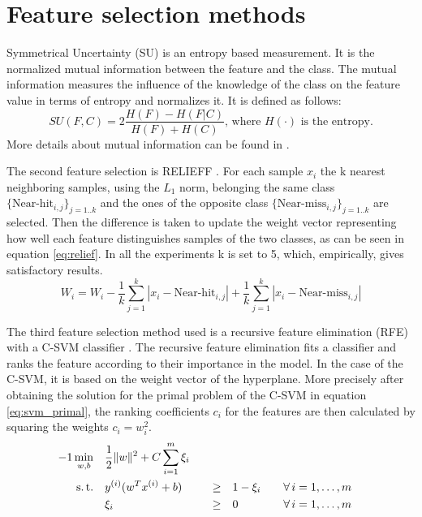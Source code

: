 \documentclass[twoside,11pt]{article}
\begin{document}
\section{Feature selection methods}

Symmetrical Uncertainty (SU) \citep{press1996numerical} is an entropy based measurement. It is the normalized mutual information between the feature and the class. The mutual information measures the influence of the knowledge of the class on the feature value in terms of entropy and normalizes it. It is defined as follows:
\begin{equation}
  \label{eq:su}
  SU(F,C) = 2 \frac{H(F) - H(F|C)}{H(F) + H(C)} \textrm{, where } H(\cdot) \textrm{ is the entropy.}
\end{equation}
More details about mutual information can be found in \cite{paninski2003estimation}. 

The second feature selection is RELIEFF \citep{kononenko1997overcoming}. For each sample $x_i$ the k nearest neighboring samples, using the $L_1$ norm, belonging the same class $\{\textrm{Near-hit}_{i, j}\}_{j=1..k}$ and the ones of the opposite class $\{\textrm{Near-miss}_{i, j}\}_{j=1..k}$ are selected. Then the difference is taken to update the weight vector representing how well each feature distinguishes samples of the two classes, as can be seen in equation \ref{eq:relief}. In all the experiments k is set to 5, which, empirically, gives satisfactory results.
\begin{equation}
  \label{eq:relief}
  W_i = W_i - \frac{1}{k}\sum_{j=1}^{k}|x_i - \textrm{Near-hit}_{i,j}| + \frac{1}{k}\sum_{j=1}^{k} |x_i - \textrm{Near-miss}_{i,j}|
\end{equation}

The third feature selection method used is a recursive feature elimination (RFE) with a C-SVM classifier \citep{guyon2002gene}. 
The recursive feature elimination fits a classifier and ranks the feature according to their importance in the model. In the case of the C-SVM, it is based on the weight vector of the hyperplane. More precisely after obtaining the solution for the primal problem of the C-SVM in equation \ref{eq:svm_primal}, the ranking coefficients $c_i$ for the features are then calculated by squaring the weights $c_i = w_i^2$.
\begin{alignat}{-1}
     \min_{w,b}  & \quad \frac12\|w\|^2 + C\sum_{i=1}^m \xi_i & & & \label{eq:svm_primal} \\ 
   \text{s.\,t.} & \quad y^{(i)} (w^Tx^{(i)} + b) & \quad \geq & \quad 1 -\xi_i &&
                   \quad \forall \, i = 1, \ldots, m \nonumber \\
                 & \quad \xi_i                  & \quad \geq & \quad 0 &&
                   \quad \forall \, i = 1, \ldots, m \nonumber 
\end{alignat}
\end{document}
